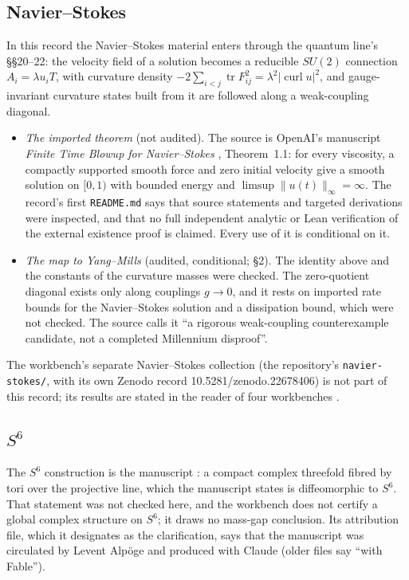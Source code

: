 \subsection{Navier--Stokes}

In this record the Navier--Stokes material enters through the quantum line's §§20--22: the velocity field of a solution becomes a reducible $SU(2)$ connection $A_i=\lambda u_iT$, with curvature density $-2\sum_{i<j}\operatorname{tr}F_{ij}^2=\lambda^2|\operatorname{curl}u|^2$, and gauge-invariant curvature states built from it are followed along a weak-coupling diagonal.
\begin{itemize}
\item \emph{The imported theorem} (not audited). The source is OpenAI's manuscript \emph{Finite Time Blowup for Navier--Stokes} \cite{OpenAINS}, Theorem~1.1: for every viscosity, a compactly supported smooth force and zero initial velocity give a smooth solution on $[0,1)$ with bounded energy and $\limsup\|u(t)\|_\infty=\infty$. The record's first \texttt{README.md} says that source statements and targeted derivations were inspected, and that no full independent analytic or Lean verification of the external existence proof is claimed. Every use of it is conditional on it.
\item \emph{The map to Yang--Mills} (audited, conditional;  §2). The identity above and the constants of the curvature masses were checked. The zero-quotient diagonal exists only along couplings $g\to0$, and it rests on imported rate bounds for the Navier--Stokes solution and a dissipation bound, which were not checked. The source calls it ``a rigorous weak-coupling counterexample candidate, not a completed Millennium disproof''.
\end{itemize}
The workbench's separate Navier--Stokes collection (the repository's \texttt{navier-stokes/}, with its own Zenodo record 10.5281/zenodo.22678406) is not part of this record; its results are stated in the reader of four workbenches \cite{WorkbenchReader}.

\subsection{\texorpdfstring{$S^6$}{S6}}

The $S^6$ construction is the manuscript \cite{AlpogeS6}: a compact complex threefold fibred by tori over the projective line, which the manuscript states is diffeomorphic to $S^6$. That statement was not checked here, and the workbench does not certify a global complex structure on $S^6$; it draws no mass-gap conclusion. Its attribution file, which it designates as the clarification, says that the manuscript was circulated by Levent Alpöge and produced with Claude (older files say ``with Fable'').

